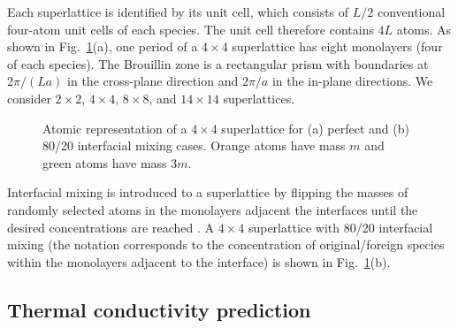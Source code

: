 Each superlattice is identified by its unit cell, which consists of $L/2$ conventional four-atom unit cells of each species. The unit cell therefore contains $4L$ atoms. As shown in Fig.~\ref{fig:md_domain}(a), one period of a $4\times4$ superlattice has eight monolayers (four of each species). The Brouillin zone is a rectangular prism with boundaries at $2\pi/(La)$ in the cross-plane direction and $2\pi/a$ in the in-plane directions. We consider $2\times2$, $4\times4$, $8\times8$, and $14\times14$ superlattices.
\begin{figure}[t!]
\begin{center}
\renewcommand{\figure}{Fig.}
\caption{Atomic representation of a $4\times4$ superlattice for (a) perfect and (b) 80/20 interfacial mixing cases. Orange atoms have mass  $m$ and green atoms have mass $3m$.}
\label{fig:md_domain}
\end{center}
\end{figure}

Interfacial mixing is introduced to a superlattice by flipping the masses of randomly selected atoms in the monolayers adjacent the interfaces until the desired concentrations are reached \cite{PhysRevB.79.075316}. A $4\times4$ superlattice with 80/20 interfacial mixing (the notation corresponds to the concentration of original/foreign species within the monolayers adjacent to the interface) is shown in Fig.~\ref{fig:md_domain}(b).

\subsection{Thermal conductivity prediction}\label{SEC:methods}

